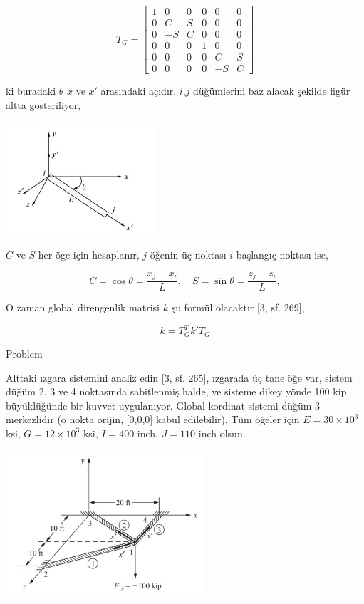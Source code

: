 \documentclass[12pt,fleqn]{article}\usepackage{../../common}
\begin{document}
$$
T_G = \left[\begin{array}{cccccc}
1 & 0 & 0 & 0 & 0 & 0 \\
0 & C & S & 0 & 0 & 0 \\ 
0 & -S & C & 0 & 0 & 0 \\ 
0 & 0 & 0 & 1 & 0 & 0 \\ 
0 & 0 & 0 & 0 & C & S \\ 
0 & 0 & 0 & 0 & -S & C 
\end{array}\right]
$$

ki buradaki $\theta$ $x$ ve $x'$ arasındaki açıdır, $i$,$j$ düğümlerini baz
alacak şekilde figür altta gösteriliyor,

\includegraphics[width=15em]{compscieng_bpp43fem_05.jpg}

$C$ ve $S$ her öge için hesaplanır, $j$ öğenin üç noktası $i$ başlangıç
noktası ise,

$$
C = \cos\theta = \frac{x_j - x_i}{L}, \quad
S = \sin\theta = \frac{z_j - z_i}{L},
$$

O zaman global direngenlik matrisi $k$ şu formül olacaktır [3, sf. 269],

$$
k = T_G^T k' T_G
$$

Problem

Alttaki ızgara sistemini analiz edin [3, sf. 265], ızgarada üç tane öğe var,
sistem düğüm 2, 3 ve 4 noktasında sabitlenmiş halde, ve sisteme dikey yönde 100
kip büyüklüğünde bir kuvvet uygulanıyor. Global kordinat sistemi düğüm 3
merkezlidir (o nokta orijin, [0,0,0] kabul edilebilir).  Tüm öğeler için $E = 30
\times 10^3$ ksi, $G = 12 \times 10^3$ ksi, $I = 400$ inch, $J = 110$ inch
olsun.

\includegraphics[width=20em]{compscieng_bpp43fem_06.jpg}
\end{document}

